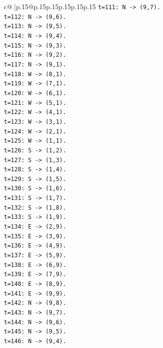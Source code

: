 \documentclass{article}
\begin{document}
{\begin{supertabular}{c@{$\;$}|p{.15\linewidth}@{}p{.15\linewidth}p{.15\linewidth}p{.15\linewidth}p{.15\linewidth}p{.15\linewidth}}
{{{\texttt{t=111: N {-}> (9,7).} \\
\texttt{t=112: N {-}> (9,6).} \\
\texttt{t=113: N {-}> (9,5).} \\
\texttt{t=114: N {-}> (9,4).} \\
\texttt{t=115: N {-}> (9,3).} \\
\texttt{t=116: N {-}> (9,2).} \\
\texttt{t=117: N {-}> (9,1).} \\
\texttt{t=118: W {-}> (8,1).} \\
\texttt{t=119: W {-}> (7,1).} \\
\texttt{t=120: W {-}> (6,1).} \\
\texttt{t=121: W {-}> (5,1).} \\
\texttt{t=122: W {-}> (4,1).} \\
\texttt{t=123: W {-}> (3,1).} \\
\texttt{t=124: W {-}> (2,1).} \\
\texttt{t=125: W {-}> (1,1).} \\
\texttt{t=126: S {-}> (1,2).} \\
\texttt{t=127: S {-}> (1,3).} \\
\texttt{t=128: S {-}> (1,4).} \\
\texttt{t=129: S {-}> (1,5).} \\
\texttt{t=130: S {-}> (1,6).} \\
\texttt{t=131: S {-}> (1,7).} \\
\texttt{t=132: S {-}> (1,8).} \\
\texttt{t=133: S {-}> (1,9).} \\
\texttt{t=134: E {-}> (2,9).} \\
\texttt{t=135: E {-}> (3,9).} \\
\texttt{t=136: E {-}> (4,9).} \\
\texttt{t=137: E {-}> (5,9).} \\
\texttt{t=138: E {-}> (6,9).} \\
\texttt{t=139: E {-}> (7,9).} \\
\texttt{t=140: E {-}> (8,9).} \\
\texttt{t=141: E {-}> (9,9).} \\
\texttt{t=142: N {-}> (9,8).} \\
\texttt{t=143: N {-}> (9,7).} \\
\texttt{t=144: N {-}> (9,6).} \\
\texttt{t=145: N {-}> (9,5).} \\
\texttt{t=146: N {-}> (9,4).} \\
}}}
\end{supertabular}}
\end{document}
